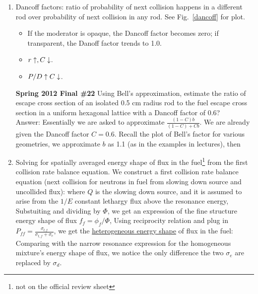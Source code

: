 \documentclass{school-22.211-notes}
\begin{document}
\begin{enumerate}
    \item Dancoff factors: ratio of probability of next collision happens in a different rod over probability of next collision in any rod. See Fig.~\ref{dancoff} for plot. 
      \begin{itemize}
      \item If the moderator is opaque, the Dancoff factor becomes zero; if transparent, the Danoff factor trends to 1.0. 
      \item $r \uparrow, C \downarrow$. 
      \item $P/D \uparrow C \downarrow$. 
      \end{itemize}
      \textbf{Spring 2012 Final \#22} Using Bell's approximation, estimate the ratio of escape cross section of an isolated 0.5 cm radius rod to the fuel escape cross section in a uniform hexagonal lattice with a Dancoff factor of 0.6? \\
      Answer: Essentially we are asked to approximate $\displaystyle \frac{(1-C)b}{(1-C) + Cb}$. We are already given the Dancoff factor $C = 0.6$. Recall the plot of Bell's factor for various geometries, we approximate $b$ as 1.1 (as in the examples in lectures), then 

    \item Solving for spatially averaged energy shape of flux in the fuel\footnote{not on the official review sheet} from the first collision rate balance equation.  We construct a first collision rate balance equation (next collision for neutrons in fuel from slowing down source and uncollided flux): 
      where $Q$ is the slowing down source, and it is assumed to arise from the $1/E$ constant lethargy flux above the resonance energy, 
      Substuiting and dividing by $\Phi$, we get an expression of the fine structure energy shape of flux $f_f = \phi_f / \Phi$, 
      Using reciprocity relation and plug in $P_{ff} = \frac{\sigma_{t.f}}{\sigma_{t,f} + \sigma_e}$, we get the \uline{heterogeneous energy shape} of flux in the fuel: 
     Comparing with the narrow resonance expression for the homogeneous mixture's energy shape of flux, we notice the only difference the two $\sigma_e$ are replaced by $\sigma_d$. 
  \end{enumerate}
\end{document}
